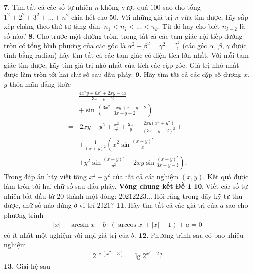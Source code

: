 \begin{multicols}{2}
	\vskip 0.1cm
	$\pmb{7.}$ Tìm tất cả các số tự nhiên $n$ không vượt quá $100$ sao cho tổng ${1^2} + {2^2} + {3^2} + ... + {n^2}$  chia hết cho $50$.
	\vskip 0.1cm
	Với những giá trị $n$ vừa tìm được, hãy sắp xếp chúng theo thứ tự tăng dần:  ${n_1} < {n_2} < ... < {n_k}$. Từ đó hãy cho biết $n_{k-2}$ là số nào?
	\vskip 0.1cm
	$\pmb{8.}$ Cho trước một đường tròn, trong tất cả các tam giác nội tiếp đường tròn có tổng bình phương của các góc là $\alpha^2 + \beta^2 = \gamma^2 = \frac{\pi^2}{2}$ (các góc  $\alpha$,  $\beta$, $\gamma$ được tính bằng radian) hãy tìm tất cả các tam giác có diện tích \linebreak lớn nhất.
	\vskip 0.1cm
	Với mỗi tam giác tìm được, hãy tìm giá trị nhỏ nhất của tích các cặp góc. Giá trị nhỏ nhất được làm tròn tới hai chữ số sau dấu phảy. 
	\vskip 0.1cm
	$\pmb{9.}$ Hãy tìm tất cả các cặp số dương $x$, $y$ thỏa mãn đẳng thức
	\begin{align*}
		&\frac{{4{x^2}y + 6{x^2} + 2xy - 4x}}{{3x - y - 2}} \\
		&+ \sin \left( {\frac{{3{x^2} + xy + x - y - 2}}{{3x - y - 2}}} \right)\\
		= &\,2xy + {y^2} + \frac{{{x^2}}}{{{y^2}}} + \frac{{2x}}{y} + \frac{{2xy({x^2} + {y^2})}}{{{{(3x - y - 2)}^2}}} + \\
		&+ \frac{1}{{{{(x + y)}^2}}}\left( {x^2}\sin \frac{{{{(x + y)}^2}}}{x}\right. \\
		&\left.+ {y^2}\sin \frac{{{{(x + y)}^2}}}{{{y^2}}} + 2xy\sin \frac{{{{(x + y)}^2}}}{{3x - y - 2}} \right).
	\end{align*}
	Trong đáp án hãy viết tổng $x^2 + y^2$ của tất cả các nghiệm  $(x,y)$. Kết quả được làm tròn tới hai chữ số sau dấu phảy. 
	\vskip 0.1cm
	\textbf{\color{cackithi}Vòng chung kết}
	\vskip 0.1cm
	\textbf{\color{cackithi}Đề $\pmb{1}$}
	\vskip 0.1cm
	$\pmb{10.}$ Viết các số tự nhiên bắt đầu từ $20$ thành một dòng: $20212223\ldots$ Hỏi rằng trong dãy kỹ tự thu được, chữ số nào đứng ở vị trí $2021$?
	\vskip 0.1cm
	$\pmb{11.}$ Hãy tìm tất cả các giá trị của $a$ sao cho phương trình
	\begin{align*}
		|x| \!-\! \arcsin x \!+\! b \!\cdot\! (\arccos x\, \!+\! |x| \!-\! 1) \!+\! a \!=\! 0
	\end{align*}
	có ít nhât một nghiệm với mọi giá trị của $b$.
	\vskip 0.1cm
	$\pmb{12.}$ Phương trình sau có bao nhiêu nghiệm
	\begin{align*}
		{2^{\lg ({x^2} - 3)}} = \lg {2^{{x^2} - 2}}?
	\end{align*}
	$\pmb{13.}$ Giải hệ sau
	\begin{align*}

\end{align*}
\end{multicols}
